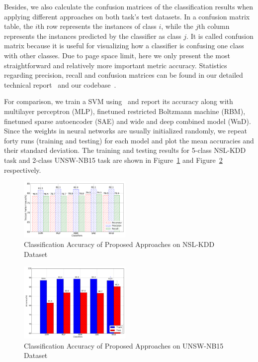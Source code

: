 Besides, we also calculate the confusion matrices of the classification results when applying
different approaches on both task's test datasets.
In a confusion matrix table, the $i$th row represents the instances of class $i$,
while the $j$th column represents the instances predicted by the classifier as class $j$.
It is called confusion matrix because it is useful for visualizing how a classifier
is confusing one class with other classes.
Due to page space limit, here we only present the most straightforward
and relatively more important metric accuracy.
Statistics regarding precision, recall and confusion matrices can be found
in our detailed technical report~\cite{OurWonReport} and our codebase~\cite{NetLearner}.

For comparison, we train a SVM using~\cite{ScikitLearnSVM} and report its accuracy along
with multilayer perceptron (MLP), finetuned restricted Boltzmann machine (RBM),
finetuned sparse autoencoder (SAE) and wide and deep combined model (WnD).
Since the weights in neural networks are usually initialized randomly, we repeat forty
runs (training and testing) for each model and plot the mean accuracies and their standard deviation.
The training and testing results for 5-class NSL-KDD task and 2-class UNSW-NB15 task are
shown in Figure~\ref{Fig:CompAccuracyNSL} and Figure~\ref{Fig:CompAccuracyUNSW} respectively.


\begin{figure}[h]
    \centering
    \includegraphics[width=0.48\textwidth]{figures/comp_accuracy_nsl.pdf}
    \caption{Classification Accuracy of Proposed Approaches on NSL-KDD Dataset}
    \label{Fig:CompAccuracyNSL}
\end{figure}

\begin{figure}[h]
    \centering
    \includegraphics[width=0.48\textwidth]{figures/comp_accuracy_unsw.pdf}
    \caption{Classification Accuracy of Proposed Approaches on UNSW-NB15 Dataset}
    \label{Fig:CompAccuracyUNSW}
\end{figure}

